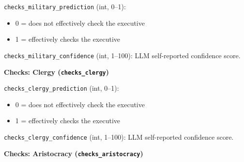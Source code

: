 \documentclass[11pt, a4paper]{article}
\newenvironment{promptquote}{%
  \begin{quote}\small
}{%
  \end{quote}
}
\begin{document}
\texttt{checks\_military\_prediction} (int, 0--1):
\begin{itemize}[nosep, leftmargin=1.7em]
  \item 0 = does not effectively check the executive
  \item 1 = effectively checks the executive
\end{itemize}
\texttt{checks\_military\_confidence} (int, 1--100): LLM self-reported confidence score.

\bigskip
\textbf{Checks: Clergy (\texttt{checks\_clergy})}




\texttt{checks\_clergy\_prediction} (int, 0--1):
\begin{itemize}[nosep, leftmargin=1.7em]
  \item 0 = does not effectively check the executive
  \item 1 = effectively checks the executive
\end{itemize}
\texttt{checks\_clergy\_confidence} (int, 1--100): LLM self-reported confidence score.

\bigskip
\textbf{Checks: Aristocracy (\texttt{checks\_aristocracy})}

\end{document}
